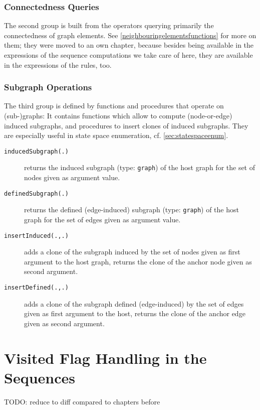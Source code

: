 \subsubsection*{Connectedness Queries}
The second group is built from the operators querying primarily the connectedness of graph elements.
See \ref{neighbouringelementsfunctions} for more on them; they were moved to an own chapter, because besides being available in the expressions of the sequence computations we take care of here,
they are available in the expressions of the rules, too.

\subsubsection*{Subgraph Operations}\label{subgraphoperations}
The third group is defined by functions and procedures that operate on (sub-)graphs:
It contains functions which allow to compute (node-or-edge) induced subgraphs, and procedures to insert clones of induced subgraphs.
They are especially useful in state space enumeration, cf. \ref{sec:statespaceenum}.

\begin{description}
\item[\texttt{inducedSubgraph(.)}] returns the induced subgraph (type: \texttt{graph}) of the host graph for the set of nodes given as argument value.
\item[\texttt{definedSubgraph(.)}] returns the defined (edge-induced) subgraph (type: \texttt{graph}) of the host graph for the set of edges given as argument value.
\item[\texttt{insertInduced(.,.)}] adds a clone of the subgraph induced by the set of nodes given as first argument to the host graph, returns the clone of the anchor node given as second argument.
\item[\texttt{insertDefined(.,.)}] adds a clone of the subgraph defined (edge-induced) by the set of edges given as first argument to the host, returns the clone of the anchor edge given as second argument.
\end{description}


\section{Visited Flag Handling in the Sequences}\label{sec:visited}
TODO: reduce to diff compared to chapters before


